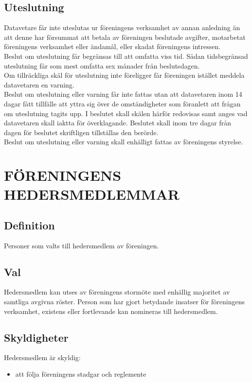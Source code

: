 \documentclass[a4paper]{article}
\begin{document}
{{    \subsection{Uteslutning}
    Datavetare får inte uteslutas ur föreningens verksamhet av annan anledning än att denne har försummat att betala av föreningen beslutade avgifter, motarbetat föreningens verksamhet eller ändamål, eller skadat föreningens intressen.\\
    Beslut om uteslutning får begränsas till att omfatta viss tid. Sådan tidsbegränsad uteslutning får som mest omfatta sex månader från beslutsdagen.\\
    Om tillräckliga skäl för uteslutning inte föreligger får föreningen istället meddela datavetaren en varning.\\
    Beslut om uteslutning eller varning får inte fattas utan att datavetaren inom 14 dagar fått tillfälle att yttra sig över de omständigheter som föranlett att frågan om uteslutning tagits upp. I beslutet skall skälen härför redovisas samt anges vad datavetaren skall iaktta för överklagande. Beslutet skall inom tre dagar från dagen för beslutet skriftligen tillställas den berörde.\\
    Beslut om uteslutning eller varning skall enhälligt fattas av föreningens styrelse.}
  \section{FÖRENINGENS HEDERSMEDLEMMAR}
  {\subsection{Definition}
    Personer som valts till hedersmedlem av föreningen.
    \subsection{Val}
    Hedersmedlem kan utses av föreningens stormöte med enhällig majoritet av samtliga avgivna röster. Person som har gjort betydande insatser för föreningens verksamhet, existens eller fortlevande kan nomineras till hedersmedlem.
    \subsection{Skyldigheter}
    Hedersmedlem är skyldig:
    \begin{itemize}
    \item att följa föreningens stadgar och reglemente
    \end{itemize}
}}
\end{document}
